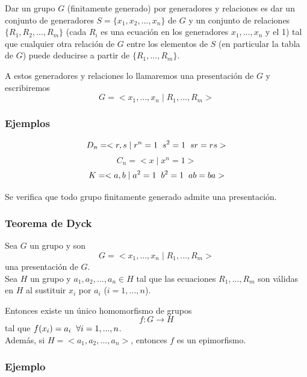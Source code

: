\documentclass[11pt,a4paper]{article}
\begin{document}
Dar un grupo $G$ (finitamente generado) por generadores y relaciones es dar un conjunto de generadores $S = \{x_{1}, x_{2}, ..., x_{n}\}$ de $G$ y un conjunto de relaciones $\{R_{1}, R_{2}, ..., R_{m}\}$ (cada $R_{i}$ es una ecuación en los generadores $x_{1}, ..., x_{n}$ y el 1) tal que cualquier otra relación de $G$ entre los elementos de $S$ (en particular la tabla de $G$) puede deducirse a partir de $\{R_{1}, ..., R_{m}\}$.

A estos generadores y relaciones lo llamaremos una presentación de $G$ y escribiremos
$$G = <x_{1}, ..., x_{n} \mid R_{1}, ..., R_{m}>$$

\subsubsection*{Ejemplos}

$$D_{n} = <r, s \mid r^{n} = 1 \hspace{0.2cm} s^{2} = 1 \hspace{0.2cm} sr=rs>$$
$$C_{n} = <x \mid x^{n} = 1>$$
$$K = <a, b \mid a^{2} = 1 \hspace{0.2cm} b^{2} = 1 \hspace{0.2cm} ab = ba>$$

Se verifica que todo grupo finitamente generado admite una presentación.

\subsubsection*{Teorema de Dyck}

Sea $G$ un grupo y son
$$G = <x_{1}, ..., x_{n} \mid R_{1}, ..., R_{m}>$$
una presentación de $G$. \\
Sea $H$ un grupo y $a_{1}, a_{2}, ..., a_{n} \in H$ tal que las ecuaciones $R_{1}, ..., R_{m}$ son válidas en $H$ al sustituir $x_{i}$ por $a_{i}$ ($i = 1, ..., n$).

Entonces existe un único homomorfismo de grupos
$$f: G \to H$$
tal que $f(x_{i}) = a_{i} \hspace{0.2cm} \forall i = 1, ..., n$. \\
Además, si $H = <a_{1}, a_{2}, ..., a_{n}>$, entonces $f$ es un epimorfismo.

\subsubsection*{Ejemplo}
\end{document}
